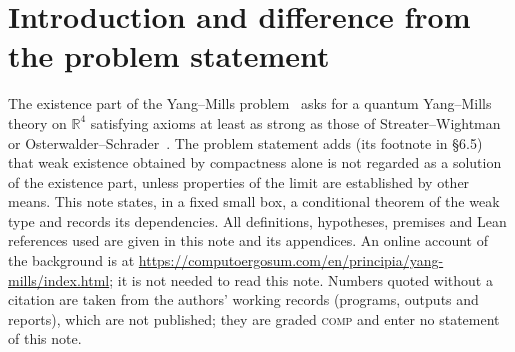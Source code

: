 \documentclass[11pt,a4paper]{article}
\theoremstyle{definition}
\theoremstyle{remark}
\newcommand{\tagC}{\textsc{comp}}
\begin{document}
\section{Introduction and difference from the problem statement}\label{sec:intro}

{\sloppy The existence part of the Yang--Mills problem~\cite{JW} asks for a quantum Yang--Mills theory on $\mathbb R^4$ satisfying axioms at least as strong as those of Streater--Wightman or Osterwalder--Schrader~\cite{OS}. The problem statement adds (its footnote in \S6.5) that weak existence obtained by compactness alone is not regarded as a solution of the existence part, unless properties of the limit are established by other means. This note states, in a fixed small box, a conditional theorem of the weak type and records its dependencies. All definitions, hypotheses, premises and Lean references used are given in this note and its appendices. An online account of the background is at \url{https://computoergosum.com/en/principia/yang-mills/index.html}; it is not needed to read this note. Numbers quoted without a citation are taken from the authors' working records (programs, outputs and reports), which are not published; they are graded \tagC{} and enter no statement of this note.\par}
\end{document}
